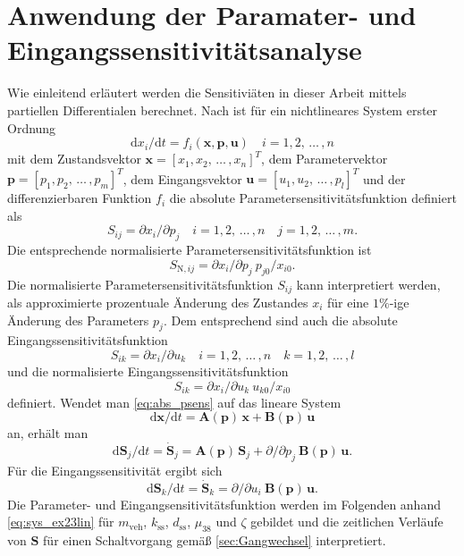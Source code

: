 \section{Anwendung der Paramater- und Eingangssensitivitätsanalyse}
Wie einleitend erläutert werden die Sensitiviäten in dieser Arbeit mittels partiellen Differentialen berechnet. Nach \cite{Hearne.1985} ist für ein nichtlineares System erster Ordnung
\begin{equation}
\mathrm{d} x_i/\mathrm{d} t = f_i(\pmb{x},\pmb{p},\pmb{u})\quad i=1,2,\,\dots\, ,n 
\end{equation}
mit dem Zustandsvektor $\pmb{x} = [x_1, x_2,\, \dots\, ,x_n]^T$, dem Parametervektor $\pmb{p} = [p_1, p_2,\, \dots\, ,p_m]^T$, dem Eingangsvektor $\pmb{u} = [u_1, u_2,\, \dots\, ,p_l]^T$ und der differenzierbaren Funktion $f_i$ die absolute Parametersensitivitätsfunktion definiert als
\begin{equation}\label{eq:abs_psens}
S_{ij} = \partial x_i/\partial p_j \quad i=1,2,\,\dots\, ,n \quad j=1,2,\,\dots\, ,m.
\end{equation}
Die entsprechende normalisierte Parametersensitivitätsfunktion ist 
\begin{equation}
S_{\mathrm{N},ij} = \partial x_i/\partial p_j\ p_{j0}/x_{i0}.
\end{equation}
Die normalisierte Parametersensitivitätsfunktion $S_{ij}$ kann interpretiert werden, als approximierte prozentuale Änderung des Zustandes $x_i$ für eine $1\%$-ige Änderung des Parameters $p_j$. Dem entsprechend sind auch die absolute Eingangssensitivitätsfunktion
\begin{equation}\label{eq:abs_usens}
S_{ik} = \partial x_i/\partial u_k \quad i=1,2,\,\dots\, ,n \quad k=1,2,\,\dots\, ,l
\end{equation}
und die normalisierte Eingangssensitivitätsfunktion
\begin{equation}\label{eq:abs_usens}
S_{ik} = \partial x_i/\partial u_k\ u_{k0}/x_{i0}
\end{equation}
definiert.
Wendet man \eqref{eq:abs_psens} auf das lineare System 
\begin{equation}
\mathrm{d} \pmb{x}/\mathrm{d} t = \pmb{A}(\pmb{p})\,\pmb{x}+\pmb{B}(\pmb{p})\,\pmb{u}
\end{equation}
an, erhält man
\begin{equation}
\mathrm{d} \pmb{S}_j/\mathrm{d} t = \dot{\pmb{S}}_j= \pmb{A}(\pmb{p})\,\pmb{S}_j+\partial/\partial p_j\ \pmb{B}(\pmb{p})\,\pmb{u}.
\end{equation}
Für die Eingangssensitivität ergibt sich 
\begin{equation}
\mathrm{d} \pmb{S}_k/\mathrm{d} t = \dot{\pmb{S}}_k= \partial/\partial u_i\ \pmb{B}(\pmb{p})\,\pmb{u}.
\end{equation}
Die Parameter- und Eingangsensitivitätsfunktion werden im Folgenden anhand \eqref{eq:sys_ex23lin} für $m_\mathrm{veh}$, $k_\mathrm{ss}$, $d_\mathrm{ss}$, $\mu_{38}$ und $\zeta$ gebildet und die zeitlichen Verläufe von $\pmb{S}$ für einen Schaltvorgang gemäß \ref{sec:Gangwechsel} interpretiert.

